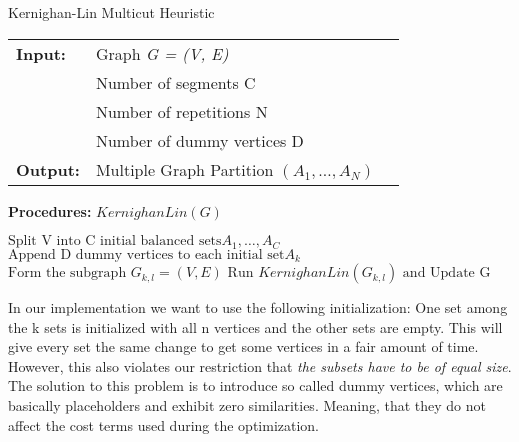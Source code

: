 \begin{algorithm}[H]
\caption{Kernighan-Lin Multicut Heuristic}
\begin{table}[H]
  \begin{tabular}{@{}lll@{}}
    \textbf{Input:} & Graph \emph{G = (V, E)} \\
        & Number of segments C \\
    & Number of repetitions N  \\
    & Number of dummy vertices D \\
	\textbf{Output:} & Multiple Graph Partition $\left( A_1,\dots, A_N \right)$ 
  \end{tabular} 
\end{table}
\textbf{Procedures:} $KernighanLin(G)$  \\
\setlength{\fboxrule}{0pt} 
\begin{boxedminipage}{1.0\textwidth}
  \begin{algorithmic}[1]
  	  \State $\text{Split V into C initial balanced sets} A_1,\dots,A_C$
  	  \State $\text{Append D dummy vertices to each initial set} A_k$ 
        \State $ \text{Form the subgraph } G_{k,l} = (V, E)$
		\State $\text{Run } KernighanLin(G_{k,l}) \text{ and Update G}$
      \EndFor
  \end{algorithmic}
  \end{boxedminipage}
  \vskip1.5pt
\label{alg:kl_multiple_segments}
\end{algorithm}
In our implementation we want to use the following initialization: One set among the k sets is initialized with all n vertices and the other sets are empty. This will give every set the same change to get some vertices in a fair amount of time. However, this also violates our restriction that \textit{the subsets have to be of equal size}. The solution to this problem is to introduce so called dummy vertices, which are basically placeholders and exhibit zero similarities. Meaning, that they do not affect the cost terms used during the optimization.

